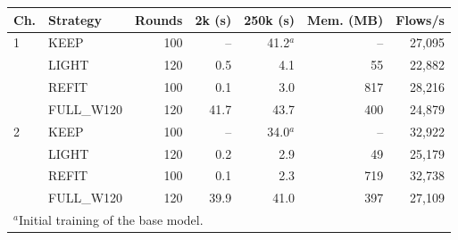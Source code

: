 \begin{tabular}{llrrrrr}
\hline
Ch. & Strategy & Rounds & 2k (s) & 250k (s) & Mem. (MB) & Flows/s \\
\hline
1 & KEEP      & 100 & --   & 41.2$^{a}$ & --  & 27,095 \\
  & LIGHT     & 120 & 0.5  & 4.1  & 55  & 22,882 \\
  & REFIT     & 100 & 0.1  & 3.0  & 817 & 28,216 \\
  & FULL\_W120 & 120 & 41.7 & 43.7 & 400 & 24,879 \\
\hline
2 & KEEP      & 100 & --   & 34.0$^{a}$ & --  & 32,922 \\
  & LIGHT     & 120 & 0.2  & 2.9  & 49  & 25,179 \\
  & REFIT     & 100 & 0.1  & 2.3  & 719 & 32,738 \\
  & FULL\_W120 & 120 & 39.9 & 41.0 & 397 & 27,109 \\
\hline
\multicolumn{7}{l}{$^{a}$Initial training of the base model.} \\
\end{tabular}